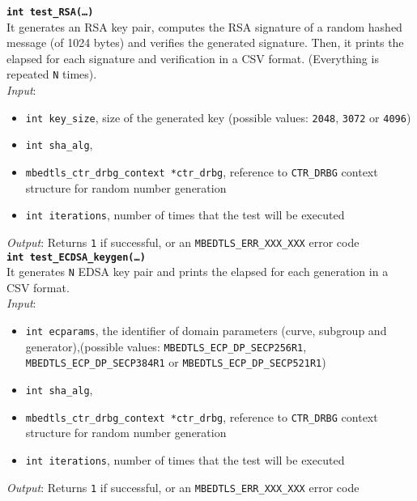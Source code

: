 \noindent
\texttt{\bfseries int test\_RSA(\dots)}\\
It generates an RSA key pair, computes the RSA signature of a random hashed message (of 1024 bytes) and verifies the generated signature. Then, it prints the elapsed for each signature and verification in a CSV format. (Everything is repeated \texttt{N} times). \\
\textit{Input}:
\begin{itemize}[noitemsep,nolistsep]
  \item \texttt{int key\_size}, size of the generated key (possible values: \texttt{2048}, \texttt{3072} or \texttt{4096})
  \item \texttt{int sha\_alg},
  \item \texttt{mbedtls\_ctr\_drbg\_context *ctr\_drbg}, reference to \texttt{CTR\_DRBG} context structure for random number generation
  \item \texttt{int iterations}, number of times that the test will be executed
\end{itemize}
\textit{Output}:  Returns \texttt{1} if successful, or an \texttt{MBEDTLS\_ERR\_XXX\_XXX} error code \\


\noindent
\texttt{\bfseries int test\_ECDSA\_keygen(\dots)}\\
It generates \texttt{N} EDSA key pair and prints the elapsed for each generation in a CSV format. \\
\textit{Input}:
\begin{itemize}[noitemsep,nolistsep]
  \item \texttt{int ecparams}, the identifier of domain parameters (curve, subgroup and generator),(possible values: \texttt{MBEDTLS\_ECP\_DP\_SECP256R1}, \texttt{MBEDTLS\_ECP\_DP\_SECP384R1} or \texttt{MBEDTLS\_ECP\_DP\_SECP521R1})
  \item \texttt{int sha\_alg},
  \item \texttt{mbedtls\_ctr\_drbg\_context *ctr\_drbg}, reference to \texttt{CTR\_DRBG} context structure for random number generation
  \item \texttt{int iterations}, number of times that the test will be executed
\end{itemize}
\textit{Output}:  Returns \texttt{1} if successful, or an \texttt{MBEDTLS\_ERR\_XXX\_XXX} error code \\


